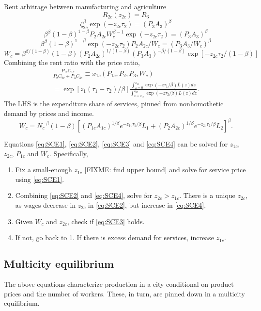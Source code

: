 \documentclass[12pt]{article}
\begin{document}
Rent arbitrage between manufacturing and agriculture
\[
R_{2c}(z_{2c}) = R_{3}
\]
\[
\zeta_{2c}^\beta\exp(-z_{2c} \tau_2) = (P_3A_3)^\beta
\]
\[
\beta^\beta(1-\beta)^{1-\beta} P_{2}A_{2c} W_c^{\beta-1}
\exp(-z_{2c} \tau_2) = (P_3A_3)^\beta
\]
\[
\beta^\beta(1-\beta)^{1-\beta} 
\exp(-z_{2c} \tau_2) P_{2}A_{2c}/W_c= (P_3A_3/W_c)^\beta
\]
\begin{equation}\tag{ii}\label{eq:SCE2}
W_c =
\beta^{\beta/(1-\beta)}(1-\beta) (P_{2}A_{2c})^{1/(1-\beta)} (P_3A_3)^{-\beta/(1-\beta)}
\exp[-z_{2c} \tau_2/(1-\beta)]
\end{equation}
Combining the rent ratio with the price ratio,
\begin{multline}\tag{iii}\label{eq:SCE3}
\frac{P_{1c}C_{1c}}{P_{2}C_{2c}+P_{3}C_{3c}}\equiv
 x_{1c}(P_{1c}, P_{2}, P_{3}, W_c) \\
 =
\exp[z_1(\tau_1-\tau_2)/\beta]
\frac {\int_{z=0}^{z_{1c}} \exp(-z \tau_1/\beta)\bar L(z)dz}
	{\int_{z=z_{1c}}^{z_{2c}} \exp(-z \tau_2/\beta)\bar L(z)dz}.
\end{multline}
The LHS is the expenditure share of services, pinned from nonhomothetic demand by prices and income.
\begin{equation}\tag{iv}\label{eq:SCE4}
	W_c = 
	N_c^{-\beta}
(1-\beta)\left[
	 \left(P_{1c}A_{1c}\right)^{1/\beta} e^{-\tilde z_{1c}{\tau_1}/{\beta} } L_1
	 + \left(P_{2}A_{2c}\right)^{1/\beta} e^{-\tilde z_{2c}{\tau_2}/{\beta} } L_2
	 \right]^\beta.
\end{equation}

Equations \eqref{eq:SCE1}, \eqref{eq:SCE2}, \eqref{eq:SCE3} and \eqref{eq:SCE4} can be solved for $z_{1c}$, $z_{2c}$, $P_{1c}$ and $W_c$. Specifically, 
\begin{enumerate}
	\item Fix a small-enough $z_{1c}$ [FIXME: find upper bound] and solve for service price using \eqref{eq:SCE1}.
	\item Combining \eqref{eq:SCE2} and \eqref{eq:SCE4}, solve for $z_{2c}>z_{1c}$. There is a unique $z_{2c}$, as wages decrease in $z_{2c}$ in \eqref{eq:SCE2}, but increase in \eqref{eq:SCE4}.
	\item Given $W_c$ and $z_{2c}$, check if \eqref{eq:SCE3} holds.
	\item If not, go back to 1. If there is excess demand for services, increase $z_{1c}$.

\end{enumerate}

\subsection{Multicity equilibrium}
The above equations characterize production in a city conditional on product prices and the number of workers. These, in turn, are pinned down in a multicity equilibrium.
\end{document}
